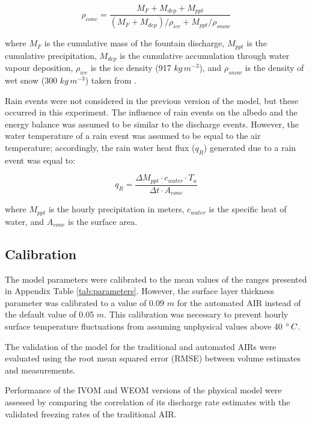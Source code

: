 \documentclass[tc, manuscript]{copernicus}
\begin{document}
\begin{equation}
  \rho_{cone} = \frac{M_{F} + M_{dep} + M_{ppt}}{(M_{F} + M_{dep})/\rho_{ice} + M_{ppt}/\rho_{snow}}
\end{equation}

where $M_F$ is the cumulative mass of the fountain discharge, $M_{ppt}$ is the cumulative precipitation,
$M_{dep}$ is the cumulative accumulation through water vapour deposition, $\rho_{ice}$ is the ice density (917
$kg\,m^{-3}$), and $\rho_{snow}$ is the density of wet snow (300 $kg\,m^{-3}$) taken from
\cite{cuffeyPhysicsGlaciers2010}.

Rain events were not considered in the previous version of the model, but these occurred in this experiment. The
influence of rain events on the albedo and the energy balance was assumed to be similar to the discharge events.
However, the water temperature of a rain event was assumed to be equal to the air temperature; accordingly, the
rain water heat flux ($q_{R}$) generated due to a rain event was equal to:

\begin{equation}
  q_{R} = \frac{\Delta M_{ppt} \cdot c_{water} \cdot T_{a}}{\Delta t \cdot A_{cone}}
\end{equation}

where $M_{ppt}$ is the hourly precipitation in meters, $c_{water}$ is the specific heat of water, and $A_{cone}$
is the surface area.

\subsection{Calibration}

The model parameters were calibrated to the mean values of the ranges presented in Appendix Table
\ref{tab:parameters}. However, the surface layer thickness parameter was calibrated to a value of 0.09 $m$ for
the automated AIR instead of the default value of 0.05 $m$. This calibration was necessary to prevent hourly
surface temperature fluctuations from assuming unphysical values above 40 $^{\circ}\,C$.

The validation of the model for the traditional and automated AIRs were evaluated using the root mean squared
error (RMSE) between volume estimates and measurements. 

Performance of the IVOM and WEOM versions of the physical model were assessed by comparing the correlation of its
discharge rate estimates with the validated freezing rates of the traditional AIR.
\end{document}
